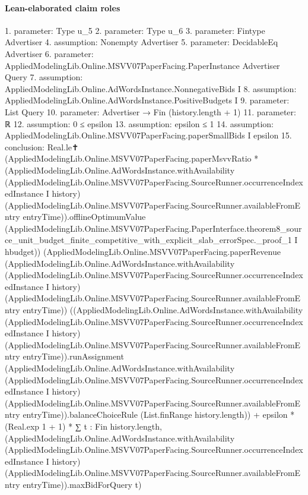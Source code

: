\documentclass[10pt]{article}
\begin{document}
\paragraph{Lean-elaborated claim roles}\begin{ReviewVerbatim}
1. parameter: Type u_5
2. parameter: Type u_6
3. parameter: Fintype Advertiser
4. assumption: Nonempty Advertiser
5. parameter: DecidableEq Advertiser
6. parameter: AppliedModelingLib.Online.MSVV07PaperFacing.PaperInstance Advertiser Query
7. assumption: AppliedModelingLib.Online.AdWordsInstance.NonnegativeBids I
8. assumption: AppliedModelingLib.Online.AdWordsInstance.PositiveBudgets I
9. parameter: List Query
10. parameter: Advertiser → Fin (history.length + 1)
11. parameter: ℝ
12. assumption: 0 ≤ epsilon
13. assumption: epsilon ≤ 1
14. assumption: AppliedModelingLib.Online.MSVV07PaperFacing.paperSmallBids I epsilon
15. conclusion: Real.le✝
  (AppliedModelingLib.Online.MSVV07PaperFacing.paperMsvvRatio *
    (AppliedModelingLib.Online.AdWordsInstance.withAvailability
          (AppliedModelingLib.Online.MSVV07PaperFacing.SourceRunner.occurrenceIndexedInstance I history)
          (AppliedModelingLib.Online.MSVV07PaperFacing.SourceRunner.availableFromEntry entryTime)).offlineOptimumValue
      (AppliedModelingLib.Online.MSVV07PaperFacing.PaperInterface.theorem8_source_unit_budget_finite_competitive_with_explicit_slab_errorSpec._proof_1
        I hbudget))
  (AppliedModelingLib.Online.MSVV07PaperFacing.paperRevenue
      (AppliedModelingLib.Online.AdWordsInstance.withAvailability
        (AppliedModelingLib.Online.MSVV07PaperFacing.SourceRunner.occurrenceIndexedInstance I history)
        (AppliedModelingLib.Online.MSVV07PaperFacing.SourceRunner.availableFromEntry entryTime))
      ((AppliedModelingLib.Online.AdWordsInstance.withAvailability
            (AppliedModelingLib.Online.MSVV07PaperFacing.SourceRunner.occurrenceIndexedInstance I history)
            (AppliedModelingLib.Online.MSVV07PaperFacing.SourceRunner.availableFromEntry entryTime)).runAssignment
        (AppliedModelingLib.Online.AdWordsInstance.withAvailability
            (AppliedModelingLib.Online.MSVV07PaperFacing.SourceRunner.occurrenceIndexedInstance I history)
            (AppliedModelingLib.Online.MSVV07PaperFacing.SourceRunner.availableFromEntry entryTime)).balanceChoiceRule
        (List.finRange history.length)) +
    epsilon * (Real.exp 1 + 1) *
      ∑ t : Fin history.length,
        (AppliedModelingLib.Online.AdWordsInstance.withAvailability
              (AppliedModelingLib.Online.MSVV07PaperFacing.SourceRunner.occurrenceIndexedInstance I history)
              (AppliedModelingLib.Online.MSVV07PaperFacing.SourceRunner.availableFromEntry entryTime)).maxBidForQuery
          t)
\end{ReviewVerbatim}
\end{document}

